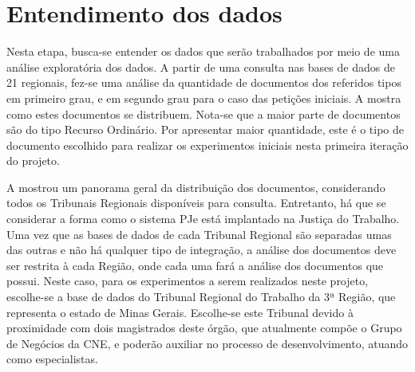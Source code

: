 
\section{Entendimento dos dados}%

Nesta etapa, busca-se entender os dados que serão trabalhados por meio de uma análise exploratória dos dados. 
A partir de uma consulta nas bases de dados de 21 regionais, fez-se uma análise da quantidade de documentos dos referidos tipos em primeiro grau, e em segundo grau para o caso das petições iniciais. A  mostra como estes documentos se distribuem. Nota-se que a maior parte de documentos são do tipo Recurso Ordinário. Por apresentar maior quantidade, este é o tipo de documento escolhido para realizar os experimentos iniciais nesta primeira iteração do projeto.


%







A   mostrou um panorama geral da distribuição dos documentos, considerando todos os Tribunais Regionais disponíveis para consulta. Entretanto, há que se considerar a forma como o sistema PJe está implantado na Justiça do Trabalho. Uma vez que as bases de dados de cada Tribunal Regional são separadas umas das outras e não há qualquer tipo de integração, a análise dos documentos deve ser restrita à cada Região, onde cada uma fará a análise dos documentos que possui. Neste caso, para os experimentos a serem realizados neste projeto, escolhe-se a base de dados do Tribunal Regional do Trabalho da 3ª Região, que representa o estado de Minas Gerais. Escolhe-se este Tribunal devido à proximidade com dois magistrados deste órgão, que atualmente compõe o Grupo de Negócios da CNE, e poderão auxiliar no processo de desenvolvimento, atuando como especialistas. 

